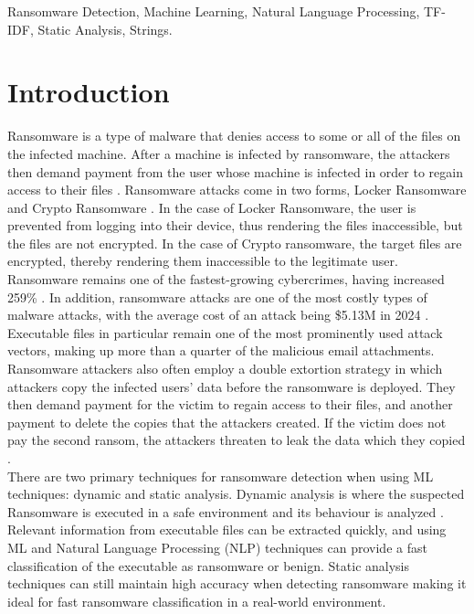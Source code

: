 \documentclass[conference]{IEEEtran}
\begin{document}
\begin{IEEEkeywords}
Ransomware Detection, Machine Learning, Natural Language Processing, TF-IDF, Static Analysis, Strings.
\end{IEEEkeywords}

\section{Introduction}
Ransomware is a type of malware that denies access to some or all of the files on the infected machine. After a machine is infected by ransomware, the attackers then demand payment from the user whose machine is infected in order to regain access to their files \cite{rans_effects}. Ransomware attacks come in two forms, Locker Ransomware and Crypto Ransomware \cite{kaspersky_2022}. In the case of Locker Ransomware, the user is prevented from logging into their device, thus rendering the files inaccessible, but the files are not encrypted. In the case of Crypto ransomware, the target files are encrypted, thereby rendering them inaccessible to the legitimate user. \\

Ransomware remains one of the fastest-growing cybercrimes, having increased 259\%  \cite{rans_growth}. In addition, ransomware attacks are one of the most costly types of malware attacks, with the average cost of an attack being \$5.13M in 2024 \cite{rans_cost}. Executable files in particular remain one of the most prominently used attack vectors, making up more than a quarter of the malicious email attachments. Ransomware attackers also often employ a double extortion strategy in which attackers copy the infected users' data before the ransomware is deployed. They then demand payment for the victim to regain access to their files, and another payment to delete the copies that the attackers created. If the victim does not pay the second ransom, the attackers threaten to leak the data which they copied \cite{double_extortion}. \\

There are two primary techniques for ransomware detection when using ML techniques: dynamic and static analysis. Dynamic analysis is where the suspected Ransomware is executed in a safe environment and its behaviour is analyzed \cite{Raghuraman2020} \cite{ElMerabet2019} \cite{dfrRansomware}. Relevant information from executable files can be extracted quickly, and using ML and Natural Language Processing (NLP) techniques can provide a fast classification of the executable as ransomware or benign. Static analysis techniques can still maintain high accuracy when detecting ransomware making it ideal for fast ransomware classification in a real-world environment.
\vspace{-0.5ex}
\end{document}
